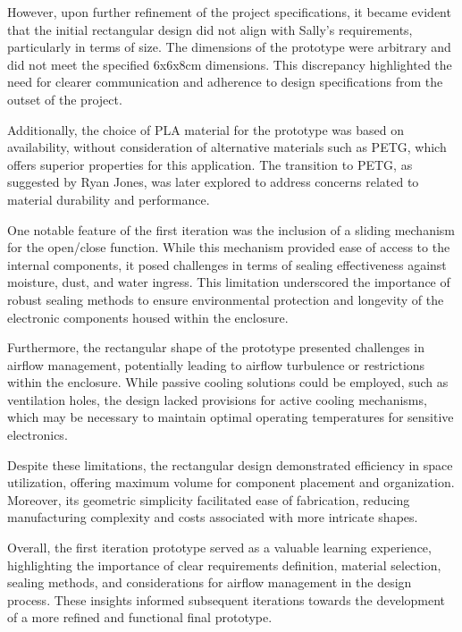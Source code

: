 \documentclass[class=report,11pt,crop=false]{standalone}
\begin{document}
However, upon further refinement of the project specifications, it became evident that the initial rectangular design did not align with Sally's requirements, particularly in terms of size. The dimensions of the prototype were arbitrary and did not meet the specified 6x6x8cm dimensions. This discrepancy highlighted the need for clearer communication and adherence to design specifications from the outset of the project.
\newline

Additionally, the choice of PLA material for the prototype was based on availability, without consideration of alternative materials such as PETG, which offers superior properties for this application. The transition to PETG, as suggested by Ryan Jones, was later explored to address concerns related to material durability and performance.
\newline

One notable feature of the first iteration was the inclusion of a sliding mechanism for the open/close function. While this mechanism provided ease of access to the internal components, it posed challenges in terms of sealing effectiveness against moisture, dust, and water ingress. This limitation underscored the importance of robust sealing methods to ensure environmental protection and longevity of the electronic components housed within the enclosure.
\newline

Furthermore, the rectangular shape of the prototype presented challenges in airflow management, potentially leading to airflow turbulence or restrictions within the enclosure. While passive cooling solutions could be employed, such as ventilation holes, the design lacked provisions for active cooling mechanisms, which may be necessary to maintain optimal operating temperatures for sensitive electronics.
\newline

Despite these limitations, the rectangular design demonstrated efficiency in space utilization, offering maximum volume for component placement and organization. Moreover, its geometric simplicity facilitated ease of fabrication, reducing manufacturing complexity and costs associated with more intricate shapes.
\newline

Overall, the first iteration prototype served as a valuable learning experience, highlighting the importance of clear requirements definition, material selection, sealing methods, and considerations for airflow management in the design process. These insights informed subsequent iterations towards the development of a more refined and functional final prototype.
\newline
\end{document}
